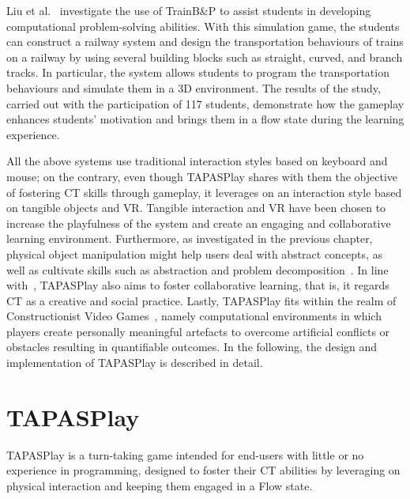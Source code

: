 Liu et al.~\cite{Liu:2011} investigate the use of TrainB\&P to assist students in developing computational problem-solving abilities. With this simulation game, the students can construct a railway system and design the transportation behaviours of trains on a railway by using several building blocks such as straight, curved, and branch tracks. In particular, the system allows students to program the transportation behaviours and simulate them in a 3D environment. The results of the study, carried out with the participation of 117 students, demonstrate how the gameplay enhances students' motivation and brings them in a flow state during the learning experience. 

All the above systems use traditional interaction styles based on keyboard and mouse; on the contrary, even though TAPASPlay shares with them the objective of fostering \ac{CT} skills through gameplay, it leverages on an interaction style based on tangible objects and \ac{VR}. Tangible interaction and \ac{VR} have been chosen to increase the playfulness of the system and create an engaging and collaborative learning environment. Furthermore, as investigated in the previous chapter, physical object manipulation might help users deal with abstract concepts, as well as cultivate skills such as abstraction and problem decomposition~\cite{Wang:2014jy}. In line with~\cite{kafai:2016}, TAPASPlay also aims to foster collaborative learning, that is, it regards \ac{CT} as a creative and social practice. Lastly, TAPAS\-Play fits with\-in the realm of Con\-struc\-tion\-ist Vid\-e\-o Games~\cite{Weintrop:2016vc}, name\-ly com\-pu\-ta\-tion\-al en\-vi\-ron\-ments in which play\-ers cre\-ate per\-son\-al\-ly mean\-ing\-ful ar\-te\-facts to o\-ver\-come ar\-ti\-fi\-cial con\-flicts or ob\-sta\-cles re\-sult\-ing in quan\-ti\-fi\-a\-ble out\-comes. In the fol\-low\-ing, the de\-sign and im\-ple\-men\-ta\-tion of TAPAS\-Play is de\-scribed in de\-tail. 

\section{TAPASPlay}\label{sec:tapasplay}
TAPASPlay is a turn-taking game intended for end-users with little or no experience in programming, designed to foster their \ac{CT} abilities by leveraging on physical interaction and keeping them engaged in a Flow state.

